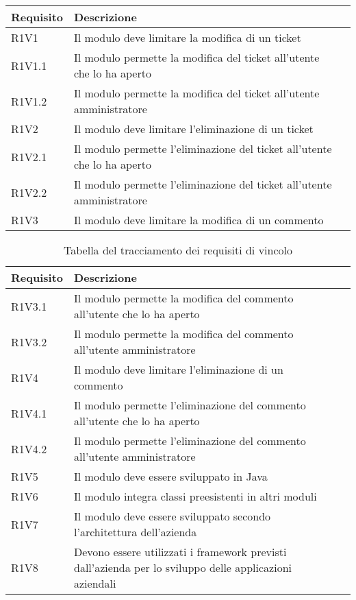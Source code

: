 \begin{table}[!h]
{\renewcommand{\arraystretch}{2}

\label{tab:requisiti-vincolo}
\begin{tabularx}{\textwidth}{PXl}
\hline\hline
\textbf{Requisito} & \textbf{Descrizione} \\
\hline
R1V1 & Il modulo deve limitare la modifica di un ticket\\
\hline
R1V1.1 & Il modulo permette la modifica del ticket all'utente che lo ha aperto\\
\hline
R1V1.2 & Il modulo permette la modifica del ticket all'utente amministratore\\
\hline
R1V2 & Il modulo deve limitare l'eliminazione di un ticket\\
\hline
R1V2.1 & Il modulo permette l'eliminazione del ticket all'utente che lo ha aperto\\
\hline
R1V2.2 & Il modulo permette l'eliminazione del ticket all'utente amministratore\\
\hline

R1V3 & Il modulo deve limitare la modifica di un commento\\
\hline

\end{tabularx}
}
\end{table}


\begin{table}[H]
{\renewcommand{\arraystretch}{2}

\label{tab:requisiti-vincolo}
\begin{tabularx}{\textwidth}{PXl}
\hline\hline
\textbf{Requisito} & \textbf{Descrizione} \\
\hline
R1V3.1 & Il modulo permette la modifica del commento all'utente che lo ha aperto\\
\hline
R1V3.2 & Il modulo permette la modifica del commento all'utente amministratore\\
\hline
R1V4 & Il modulo deve limitare l'eliminazione di un commento\\
\hline
R1V4.1 & Il modulo permette l'eliminazione del commento all'utente che lo ha aperto\\
\hline
R1V4.2 & Il modulo permette l'eliminazione del commento all'utente amministratore\\
\hline
R1V5 & Il modulo deve essere sviluppato in Java\\
\hline
R1V6 & Il modulo integra classi preesistenti in altri moduli\\
\hline
R1V7 & Il modulo deve essere sviluppato secondo l'architettura dell'azienda\\
\hline
R1V8 & Devono essere utilizzati i framework previsti dall'azienda per lo sviluppo delle applicazioni aziendali\\
\hline

\end{tabularx}
}
\caption{Tabella del tracciamento dei requisiti di vincolo}
\end{table}


